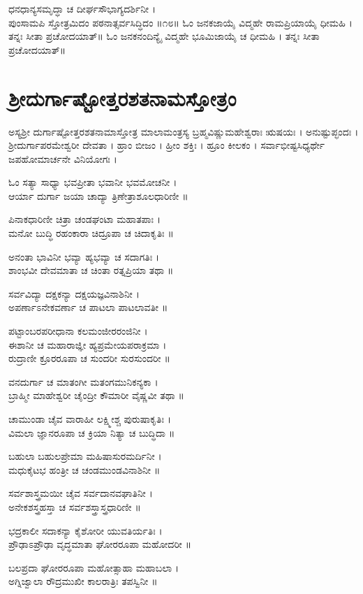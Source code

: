 ಧನಧಾನ್ಯಸಮೃದ್ಧಾ ಚ ದೀರ್ಘಸೌಭಾಗ್ಯದರ್ಶಿನೀ ।\\
ಪುಂಸಾಮಪಿ ಸ್ತೋತ್ರಮಿದಂ ಪಠನಾತ್ಸರ್ವಸಿದ್ಧಿದಂ ॥೧೮॥
ಓಂ ಜನಕಜಾಯೈ ವಿದ್ಮಹೇ ರಾಮಪ್ರಿಯಾಯೈ ಧೀಮಹಿ । ತನ್ನಃ ಸೀತಾ ಪ್ರಚೋದಯಾತ್॥
ಓಂ ಜನಕನಂದಿನ್ಯೈ ವಿದ್ಮಹೇ ಭೂಮಿಜಾಯೈ ಚ ಧೀಮಹಿ । ತನ್ನಃ ಸೀತಾ ಪ್ರಚೋದಯಾತ್॥
\section{ಶ್ರೀದುರ್ಗಾಷ್ಟೋತ್ತರಶತನಾಮಸ್ತೋತ್ರಂ}

ಅಸ್ಯಶ್ರೀ ದುರ್ಗಾಷ್ಟೋತ್ತರಶತನಾಮಾಸ್ತೋತ್ರ ಮಾಲಾಮಂತ್ರಸ್ಯ ಬ್ರಹ್ಮವಿಷ್ಣುಮಹೇಶ್ವರಾಃ ಋಷಯಃ । ಅನುಷ್ಟುಪ್ಛಂದಃ । ಶ್ರೀದುರ್ಗಾಪರಮೇಶ್ವರೀ ದೇವತಾ । ಹ್ರಾಂ ಬೀಜಂ । ಹ್ರೀಂ ಶಕ್ತಿಃ । ಹ್ರೂಂ ಕೀಲಕಂ । ಸರ್ವಾಭೀಷ್ಟಸಿಧ್ಯರ್ಥೇ ಜಪಹೋಮಾರ್ಚನೇ ವಿನಿಯೋಗಃ ।

ಓಂ ಸತ್ಯಾ ಸಾಧ್ಯಾ ಭವಪ್ರೀತಾ ಭವಾನೀ ಭವಮೋಚನೀ ।\\
ಆರ್ಯಾ ದುರ್ಗಾ ಜಯಾ ಚಾದ್ಯಾ ತ್ರಿಣೇತ್ರಾಶೂಲಧಾರಿಣೀ ॥

ಪಿನಾಕಧಾರಿಣೀ ಚಿತ್ರಾ ಚಂಡಘಂಟಾ ಮಹಾತಪಾಃ ।\\
ಮನೋ ಬುದ್ಧಿ ರಹಂಕಾರಾ ಚಿದ್ರೂಪಾ ಚ ಚಿದಾಕೃತಿಃ ॥

ಅನಂತಾ ಭಾವಿನೀ ಭವ್ಯಾ ಹ್ಯಭವ್ಯಾ ಚ ಸದಾಗತಿಃ ।\\
ಶಾಂಭವೀ ದೇವಮಾತಾ ಚ ಚಿಂತಾ ರತ್ನಪ್ರಿಯಾ ತಥಾ ॥

ಸರ್ವವಿದ್ಯಾ ದಕ್ಷಕನ್ಯಾ ದಕ್ಷಯಜ್ಞವಿನಾಶಿನೀ ।\\
ಅಪರ್ಣಾಽನೇಕವರ್ಣಾ ಚ ಪಾಟಲಾ ಪಾಟಲಾವತೀ ॥

ಪಟ್ಟಾಂಬರಪರೀಧಾನಾ ಕಲಮಂಜೀರರಂಜಿನೀ ।\\
ಈಶಾನೀ ಚ ಮಹಾರಾಜ್ಞೀ ಹ್ಯಪ್ರಮೇಯಪರಾಕ್ರಮಾ ।\\
ರುದ್ರಾಣೀ ಕ್ರೂರರೂಪಾ ಚ ಸುಂದರೀ ಸುರಸುಂದರೀ ॥

ವನದುರ್ಗಾ ಚ ಮಾತಂಗೀ ಮತಂಗಮುನಿಕನ್ಯಕಾ ।\\
ಬ್ರಾಹ್ಮೀ ಮಾಹೇಶ್ವರೀ ಚೈಂದ್ರೀ ಕೌಮಾರೀ ವೈಷ್ಣವೀ ತಥಾ ॥

ಚಾಮುಂಡಾ ಚೈವ ವಾರಾಹೀ ಲಕ್ಷ್ಮೀಶ್ಚ ಪುರುಷಾಕೃತಿಃ ।\\
ವಿಮಲಾ ಜ್ಞಾನರೂಪಾ ಚ ಕ್ರಿಯಾ ನಿತ್ಯಾ ಚ ಬುದ್ಧಿದಾ ॥

ಬಹುಲಾ ಬಹುಲಪ್ರೇಮಾ ಮಹಿಷಾಸುರಮರ್ದಿನೀ ।\\
ಮಧುಕೈಟಭ ಹಂತ್ರೀ ಚ ಚಂಡಮುಂಡವಿನಾಶಿನೀ ॥

ಸರ್ವಶಾಸ್ತ್ರಮಯೀ ಚೈವ ಸರ್ವದಾನವಘಾತಿನೀ ।\\
ಅನೇಕಶಸ್ತ್ರಹಸ್ತಾ ಚ ಸರ್ವಶಸ್ತ್ರಾಸ್ತ್ರಧಾರಿಣೀ ॥

ಭದ್ರಕಾಲೀ ಸದಾಕನ್ಯಾ ಕೈಶೋರೀ ಯುವತಿರ್ಯತಿಃ ।\\
ಪ್ರೌಢಾಽಪ್ರೌಢಾ ವೃದ್ಧಮಾತಾ ಘೋರರೂಪಾ ಮಹೋದರೀ ॥

ಬಲಪ್ರದಾ ಘೋರರೂಪಾ ಮಹೋತ್ಸಾಹಾ ಮಹಾಬಲಾ ।\\
ಅಗ್ನಿಜ್ವಾಲಾ ರೌದ್ರಮುಖೀ ಕಾಲರಾತ್ರಿಃ ತಪಸ್ವಿನೀ ॥

